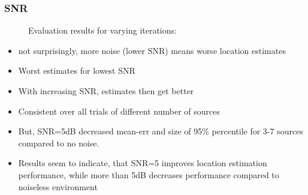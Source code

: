 \subsubsection{SNR}
\begin{figure}[H]
	\begin{tikzpicture}
	    
	    
	\end{tikzpicture}
	
	\caption[Evaluation results for varying  iterations]{Evaluation results for varying  iterations: }
	\label{fig:trial1}
\end{figure}

\begin{itemize}
    \item not surprisingly, more noise (lower SNR) means worse location estimates
    \item Worst estimates for lowest SNR
    \item With increasing SNR, estimates then get better
    \item Consistent over all trials of different number of sources
    \item But, SNR=5dB decreased mean-err and size of 95\% percentile for 3-7 sources compared to no noise.
    \item Results seem to indicate, that SNR=5 improves location estimation performance, while more than 5dB decreases performance compared to noiseless environment
\end{itemize}